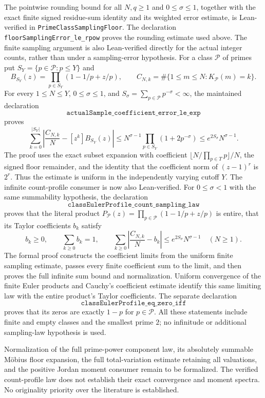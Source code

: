 \documentclass[11pt]{article}
\theoremstyle{definition}
\begin{document}
The pointwise rounding bound for all $N,q\ge1$ and
$0\le\sigma\le1$, together with the exact finite signed
residue-sum identity and its weighted error estimate, is
Lean-verified in \texttt{PrimeClassSamplingFloor}.
The declaration \texttt{floorSamplingError\_le\_rpow} proves
the rounding estimate used above.
The finite sampling argument is also Lean-verified directly for the
actual integer counts, rather than under a sampling-error hypothesis.
For a class $\mathcal P$ of primes put
$S_Y=\{p\in\mathcal P:p\le Y\}$ and
\[
 B_{S_Y}(z)=\prod_{p\in S_Y}(1-1/p+z/p),\qquad
 C_{N,k}=\#\{1\le m\le N:K_{\mathcal P}(m)=k\}.
\]
For every $1\le N\le Y$, $0\le\sigma\le1$, and
$S_\sigma=\sum_{p\in\mathcal P}p^{-\sigma}<\infty$, the maintained
declaration
\[
 \texttt{actualSample\_coefficient\_error\_le\_exp}
\]
proves
\[
 \sum_{k=0}^{|S_Y|}
 \left|\frac{C_{N,k}}N-[z^k]B_{S_Y}(z)\right|
 \le N^{\sigma-1}\prod_{p\in S_Y}(1+2p^{-\sigma})
 \le e^{2S_\sigma}N^{\sigma-1}.
\]
The proof uses the exact subset expansion with coefficient
$\lfloor N/\prod_{p\in T}p\rfloor/N$, the signed floor remainder,
and the identity that the coefficient norm of $(z-1)^r$ is $2^r$.
Thus the estimate is uniform in the independently varying cutoff $Y$.
The infinite count-profile consumer is now also Lean-verified.
For $0\le\sigma<1$ with the same summability hypothesis, the declaration
\[
 \texttt{classEulerProfile\_count\_sampling\_law}
\]
proves that the literal product
$P_{\mathcal P}(z)=\prod_{p\in\mathcal P}(1-1/p+z/p)$ is entire,
that its Taylor coefficients $b_k$ satisfy
\[
 b_k\ge0,\qquad \sum_{k\ge0}b_k=1,\qquad
 \sum_{k\ge0}\left|\frac{C_{N,k}}N-b_k\right|
       \le e^{2S_\sigma}N^{\sigma-1}\quad(N\ge1).
\]
The formal proof constructs the coefficient limits from the uniform
finite sampling estimate, passes every finite coefficient sum to the
limit, and then proves the full infinite sum bound and normalization.
Uniform convergence of the finite Euler products and Cauchy's coefficient
estimate identify this same limiting law with the entire product's
Taylor coefficients. The separate declaration
\[
 \texttt{classEulerProfile\_eq\_zero\_iff}
\]
proves that its zeros are exactly $1-p$ for $p\in\mathcal P$.
All these statements include finite and empty classes and the smallest
prime $2$; no infinitude or additional sampling-law hypothesis is used.

Normalization of the full prime-power component law, its absolutely
summable M\"obius floor expansion, the full total-variation estimate
retaining all valuations, and the positive Jordan moment consumer remain
to be formalized. The verified count-profile law does not establish
their exact convergence and moment spectra.
No originality priority over the literature is established.
\end{document}
